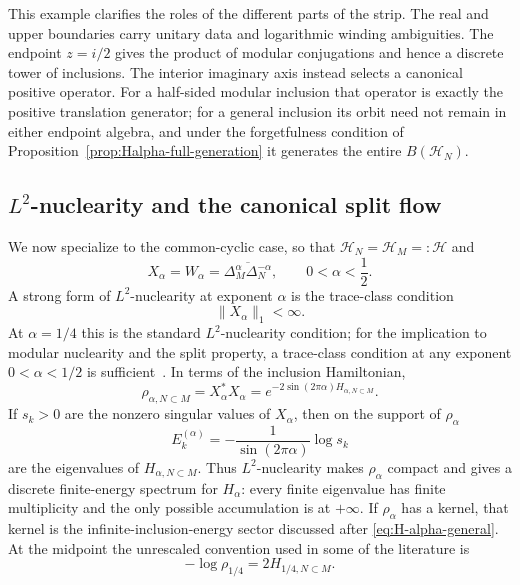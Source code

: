\documentclass[a4paper,11pt]{article}
\theoremstyle{definition}
\begin{document}
This example clarifies the roles of the different parts of the strip. The
real and upper boundaries carry unitary data and logarithmic winding
ambiguities. The endpoint $z=i/2$ gives the product of modular conjugations
and hence a discrete tower of inclusions. The interior imaginary axis instead
selects a canonical positive operator. For a half-sided modular inclusion
that operator is exactly the positive translation generator; for a general
inclusion its orbit need not remain in either endpoint algebra, and under the
forgetfulness condition of
Proposition~\ref{prop:Halpha-full-generation} it generates the entire
$B(\mathcal H_N)$.

\subsection{$L^2$-nuclearity and the canonical split flow}
\label{sec:nuclearity}

We now specialize to the common-cyclic case, so that
$\mathcal H_N=\mathcal H_M=: \mathcal H$ and
\begin{equation}
    X_\alpha=W_\alpha
    =\overline{\Delta_M^\alpha\Delta_N^{-\alpha}},
    \qquad 0<\alpha<\frac12 .
\end{equation}
A strong form of $L^2$-nuclearity at exponent $\alpha$ is the trace-class
condition
\begin{equation}
    \boxed{\|X_\alpha\|_1<\infty .}
    \label{eq:L2-nuclearity-alpha}
\end{equation}
At $\alpha=1/4$ this is the standard $L^2$-nuclearity condition; for the
implication to modular nuclearity and the split property, a trace-class condition
at any exponent $0<\alpha<1/2$ is sufficient~\cite{BDL2007}. In terms of the inclusion Hamiltonian,
\begin{equation}
    \rho_{\alpha,N\subset M}
    =X_\alpha^*X_\alpha
    =e^{-2\sin(2\pi\alpha)H_{\alpha,N\subset M}}.
    \label{eq:rho-inclusion-vs-split}
\end{equation}
If $s_k>0$ are the nonzero singular values of $X_\alpha$, then on the support
of $\rho_\alpha$
\begin{equation}
    E_k^{(\alpha)}
    =-\frac{1}{\sin(2\pi\alpha)}\log s_k
\end{equation}
are the eigenvalues of $H_{\alpha,N\subset M}$. Thus $L^2$-nuclearity makes
$\rho_\alpha$ compact and gives a discrete finite-energy spectrum for
$H_\alpha$: every finite eigenvalue has finite multiplicity and the only
possible accumulation is at $+\infty$. If $\rho_\alpha$ has a kernel, that
kernel is the infinite-inclusion-energy sector discussed after
\eqref{eq:H-alpha-general}. At the midpoint the unrescaled convention used in
some of the literature is
\begin{equation}
    -\log\rho_{1/4}=2H_{1/4,N\subset M}.
\end{equation}
\end{document}
